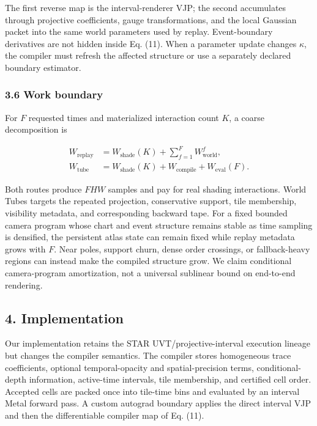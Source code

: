 \documentclass[
]{article}
\begin{document}
The first reverse map is the interval-renderer VJP; the second
accumulates through projective coefficients, gauge transformations, and
the local Gaussian packet into the same world parameters used by replay.
Event-boundary derivatives are not hidden inside Eq. (11). When a
parameter update changes \(\kappa\), the compiler must refresh the
affected structure or use a separately declared boundary estimator.

\subsubsection{3.6 Work boundary}\label{work-boundary}

For \(F\) requested times and materialized interaction count \(K\), a
coarse decomposition is

\[
\begin{aligned}
W_{\mathrm{replay}}&=W_{\mathrm{shade}}(K)+\sum_{f=1}^{F}W_{\mathrm{world}}^f,\\
W_{\mathrm{tube}}&=W_{\mathrm{shade}}(K)+W_{\mathrm{compile}}+W_{\mathrm{eval}}(F).
\end{aligned}
\tag{12}
\]

Both routes produce \(FHW\) samples and pay for real shading
interactions. World Tubes targets the repeated projection, conservative
support, tile membership, visibility metadata, and corresponding
backward tape. For a fixed bounded camera program whose chart and event
structure remains stable as time sampling is densified, the persistent
atlas state can remain fixed while replay metadata grows with \(F\).
Near poles, support churn, dense order crossings, or fallback-heavy
regions can instead make the compiled structure grow. We claim
conditional camera-program amortization, not a universal sublinear bound
on end-to-end rendering.

\subsection{4. Implementation}\label{implementation}

Our implementation retains the STAR UVT/projective-interval execution
lineage but changes the compiler semantics. The compiler stores
homogeneous trace coefficients, optional temporal-opacity and
spatial-precision terms, conditional-depth information, active-time
intervals, tile membership, and certified cell order. Accepted cells are
packed once into tile-time bins and evaluated by an interval Metal
forward pass. A custom autograd boundary applies the direct interval VJP
and then the differentiable compiler map of Eq. (11).
\end{document}
